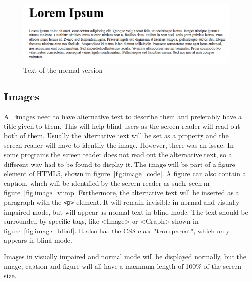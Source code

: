 \begin{figure}
	\includegraphics[width=\linewidth]{figures/Ntext.png}	
	\caption{Text of the normal version}
	\label{fig:nText}
\end{figure}

\subsection{Images}

All images need to have alternative text to describe them and preferably have a title given to them. This will help blind users as the screen reader will read out both of them. Usually the alternative text will be set as a property and the screen reader will have to identify the image. However, there was an issue. In some programs the screen reader does not read out the alternative text, so a different way had to be found to display it. The image will be part of a figure element of HTML5, shown in figure~\ref{fig:image_code}. A figure can also contain a caption, which will be identified by the screen reader as such, seen in  figure~\ref{fig:image_viimp} Furthermore, the alternative text will be inserted as a paragraph with the \lstinline|<p>| element. It will remain invisible in normal and visually impaired mode, but will appear as normal text in blind mode. The text should be surrounded by specific tags, like <Image> or <Graph> shown in figure~\ref{fig:image_blind}. It also has the CSS class "transparent", which only appears in blind mode.

Images in visually impaired and normal mode will be displayed normally, but the image, caption and figure will all have a maximum length of 100\% of the screen size.


